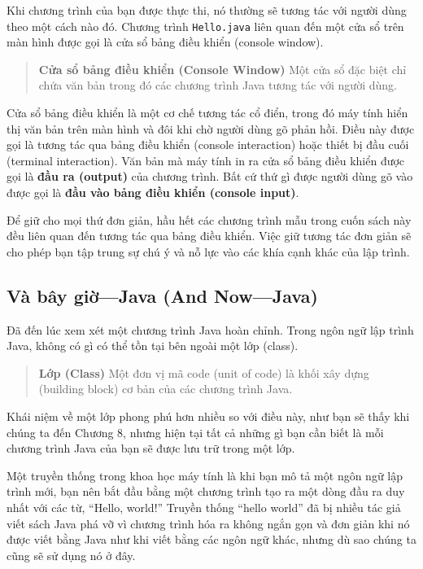 Khi chương trình của bạn được thực thi, nó thường sẽ tương tác với người
dùng theo một cách nào đó. Chương trình \texttt{Hello.java} liên quan
đến một cửa sổ trên màn hình được gọi là cửa sổ bảng điều khiển (console
window).

\begin{quote}
\textbf{Cửa sổ bảng điều khiển (Console Window)} Một cửa sổ đặc biệt chỉ
chứa văn bản trong đó các chương trình Java tương tác với người dùng.
\end{quote}

Cửa sổ bảng điều khiển là một cơ chế tương tác cổ điển, trong đó máy
tính hiển thị văn bản trên màn hình và đôi khi chờ người dùng gõ phản
hồi. Điều này được gọi là tương tác qua bảng điều khiển (console
interaction) hoặc thiết bị đầu cuối (terminal interaction). Văn bản mà
máy tính in ra cửa sổ bảng điều khiển được gọi là \textbf{đầu ra
(output)} của chương trình. Bất cứ thứ gì được người dùng gõ vào được
gọi là \textbf{đầu vào bảng điều khiển (console input)}.

Để giữ cho mọi thứ đơn giản, hầu hết các chương trình mẫu trong cuốn
sách này đều liên quan đến tương tác qua bảng điều khiển. Việc giữ tương
tác đơn giản sẽ cho phép bạn tập trung sự chú ý và nỗ lực vào các khía
cạnh khác của lập trình.

\subsection{Và bây giờ---Java (And
Now---Java)}\label{vuxe0-buxe2y-giux1eddjava-and-nowjava}

Đã đến lúc xem xét một chương trình Java hoàn chỉnh. Trong ngôn ngữ lập
trình Java, không có gì có thể tồn tại bên ngoài một lớp (class).

\begin{quote}
\textbf{Lớp (Class)} Một đơn vị mã code (unit of code) là khối xây dựng
(building block) cơ bản của các chương trình Java.
\end{quote}

Khái niệm về một lớp phong phú hơn nhiều so với điều này, như bạn sẽ
thấy khi chúng ta đến Chương 8, nhưng hiện tại tất cả những gì bạn cần
biết là mỗi chương trình Java của bạn sẽ được lưu trữ trong một lớp.

Một truyền thống trong khoa học máy tính là khi bạn mô tả một ngôn ngữ
lập trình mới, bạn nên bắt đầu bằng một chương trình tạo ra một dòng đầu
ra duy nhất với các từ, ``Hello, world!'' Truyền thống ``hello world''
đã bị nhiều tác giả viết sách Java phá vỡ vì chương trình hóa ra không
ngắn gọn và đơn giản khi nó được viết bằng Java như khi viết bằng các
ngôn ngữ khác, nhưng dù sao chúng ta cũng sẽ sử dụng nó ở đây.

